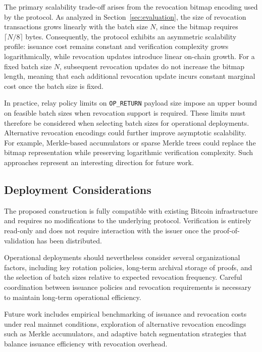 \documentclass[preprint,12pt]{elsarticle}
\begin{document}
The primary scalability trade-off arises from the revocation bitmap encoding used by the protocol. 
As analyzed in Section~\ref{sec:evaluation}, the size of revocation transactions grows linearly with the batch size $N$, since the bitmap requires $\lceil N/8 \rceil$ bytes.
Consequently, the protocol exhibits an asymmetric scalability profile: issuance cost remains constant and verification complexity grows logarithmically, while revocation updates introduce linear on-chain growth. 
For a fixed batch size $N$, subsequent revocation updates do not increase the bitmap length, meaning that each additional revocation update incurs constant marginal cost once the batch size is fixed.

In practice, relay policy limits on \texttt{OP\_RETURN} payload size impose an upper bound on feasible batch sizes when revocation support is required. 
These limits must therefore be considered when selecting batch sizes for operational deployments.
Alternative revocation encodings could further improve asymptotic scalability.
For example, Merkle-based accumulators or sparse Merkle trees could replace the
bitmap representation while preserving logarithmic verification complexity.
Such approaches represent an interesting direction for future work.
\vspace{-0.3cm}
\subsection{Deployment Considerations}

The proposed construction is fully compatible with existing Bitcoin infrastructure and requires no modifications to the underlying protocol. 
Verification is entirely read-only and does not require interaction with the issuer once the proof-of-validation has been distributed.

Operational deployments should nevertheless consider several organizational factors, including key rotation policies, long-term archival storage of proofs, and the selection of batch sizes relative to expected revocation frequency. 
Careful coordination between issuance policies and revocation requirements is necessary to maintain long-term operational efficiency.

Future work includes empirical benchmarking of issuance and revocation costs under real mainnet conditions, exploration of alternative revocation encodings such as Merkle accumulators, and adaptive batch segmentation strategies that balance issuance efficiency with revocation overhead.
\end{document}
